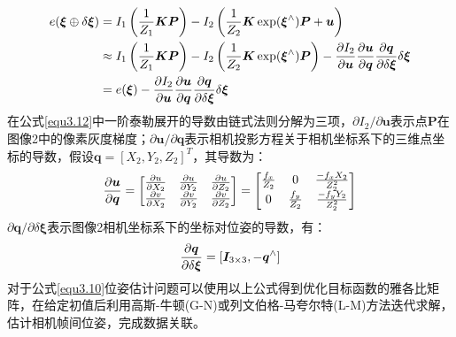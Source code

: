 \begin{equation}
\label{equ3.12}
\begin{aligned}
e(\boldsymbol{\xi}\oplus \delta \boldsymbol{\xi}) &= I_1\left({1 \over Z_1} \boldsymbol{K} \boldsymbol{P} \right) - I_2 \left({1 \over Z_2} \boldsymbol{K} \exp (\boldsymbol{\xi}^{\wedge}) \boldsymbol{P}+ \boldsymbol{u} \right) 
\\ 
& \approx I_1\left({1 \over Z_1} \boldsymbol{K} \boldsymbol{P} \right) - I_2 \left({1 \over Z_2} \boldsymbol{K} \exp (\boldsymbol{\xi}^{\wedge}) \boldsymbol{P} \right) - {\partial I_2 \over \partial \boldsymbol{u}} {\partial \boldsymbol{u} \over \partial \boldsymbol{q}} {\partial \boldsymbol{q} \over \partial \delta \boldsymbol{\xi}} \delta \boldsymbol{\xi}
\\
& = e(\boldsymbol{\xi}) - {\partial I_2 \over \partial \boldsymbol{u}} {\partial \boldsymbol{u} \over \partial \boldsymbol{q}} {\partial \boldsymbol{q} \over \partial \delta \boldsymbol{\xi}} \delta \boldsymbol{\xi}
\end{aligned}
\end{equation}
在公式\eqref{equ3.12}中一阶泰勒展开的导数由链式法则分解为三项，$\partial I_2 / \partial \boldsymbol{u}$表示点$\boldsymbol{P}$在图像2中的像素灰度梯度；$\partial \boldsymbol{u} / \partial \boldsymbol{q}$表示相机投影方程关于相机坐标系下的三维点坐标的导数，假设$\boldsymbol{q} = \left[X_2,Y_2,Z_2 \right]^T$，其导数为：
\begin{equation}
\label{equ3.13}
{ \partial \boldsymbol{u} \over \partial \boldsymbol{q} } = 
\begin{bmatrix}
\partial u \over \partial X_2 & \partial u \over \partial Y_2 & \partial u \over \partial Z_2 \cr
\partial v \over \partial X_2 & \partial v \over \partial Y_2 & \partial v \over \partial Z_2 \cr
\end{bmatrix} = 
\begin{bmatrix}
f_x \over Z_2 & 0 & -f_x X_2 \over Z_2^2 \cr
0 & f_y \over Z_2 & - f_y Y_2 \over Z_2^2 \cr
\end{bmatrix}
\end{equation}
${\partial \boldsymbol{q} / \partial \delta \boldsymbol{\xi}}$表示图像2相机坐标系下的坐标对位姿的导数，有：
\begin{equation}
\label{equ3.14}
{\partial \boldsymbol{q} \over \partial \delta \boldsymbol{\xi}} = \left[\boldsymbol{I}_{3\times 3},-\boldsymbol{q}^{\wedge} \right]
\end{equation}
对于公式\eqref{equ3.10}位姿估计问题可以使用以上公式得到优化目标函数的雅各比矩阵，在给定初值后利用高斯-牛顿(G-N)或列文伯格-马夸尔特(L-M)方法迭代求解，估计相机帧间位姿，完成数据关联。




